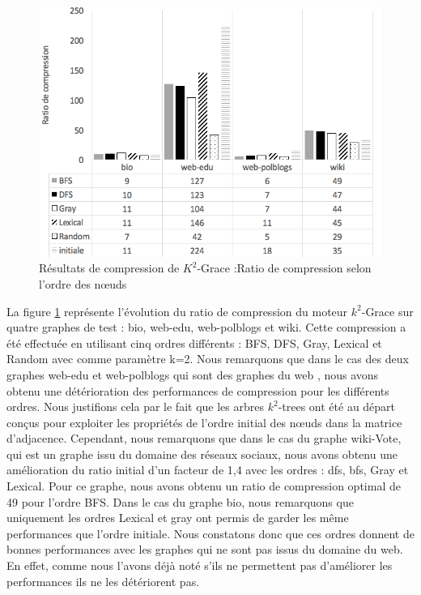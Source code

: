 \begin{figure}[H]
	\centering
	\includegraphics[scale=0.65]{ressources/image/Tests/k2-ordre.png}
	\caption{Résultats de compression de $K^2$-Grace :Ratio de compression selon l'ordre des nœuds}
	\label{fig:K2-ordre }
\end{figure}		

La figure \ref{fig:K2-ordre } représente l'évolution du ratio de compression du moteur $k^2$-Grace sur quatre graphes de test : bio, web-edu, web-polblogs et wiki. Cette compression a été effectuée en utilisant cinq ordres différents : BFS, DFS, Gray, Lexical et Random avec comme paramètre k=2. Nous remarquons que dans le cas des deux graphes web-edu et web-polblogs qui sont des graphes du web , nous avons obtenu une détérioration des performances de compression pour les différents ordres. Nous justifions cela par le fait que les arbres $k^2$-trees ont été au départ conçus pour exploiter les propriétés de l'ordre initial des nœuds dans la matrice d'adjacence. Cependant, nous remarquons que dans le cas du graphe wiki-Vote, qui est un graphe issu du domaine des réseaux sociaux, nous avons obtenu une amélioration du ratio initial d'un facteur de 1,4 avec les ordres : \gls{dfs}, \gls{bfs}, Gray et Lexical. Pour ce graphe, nous avons obtenu un ratio de compression optimal de 49 pour l'ordre BFS. Dans le cas du graphe bio, nous remarquons que uniquement les ordres Lexical et gray ont permis de garder les même performances que l'ordre initiale. Nous constatons donc que ces ordres donnent de bonnes performances avec les graphes qui ne sont pas issus du domaine du web. En effet, comme nous l'avons déjà noté s'ils ne permettent pas d'améliorer les performances ils ne les détériorent pas.


